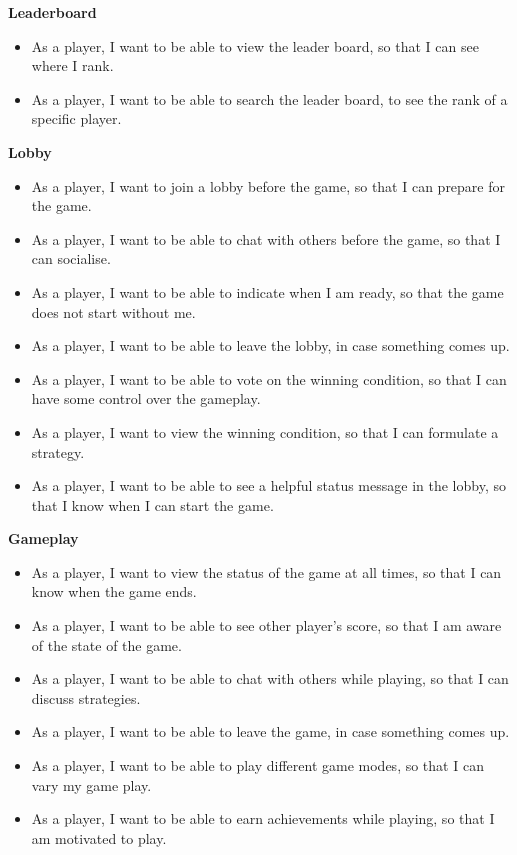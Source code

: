 \documentclass{l4proj}
\begin{document}
\textbf{Leaderboard}
\begin{itemize}
    \item As a player, I want to be able to view the leader board, so that I can see where I rank.
    \item As a player, I want to be able to search the leader board, to see the rank of a specific player.
\end{itemize}

\textbf{Lobby}
\begin{itemize}
    \item As a player, I want to join a lobby before the game, so that I can prepare for the game.
    \item As a player, I want to be able to chat with others before the game, so that I can socialise.
    \item As a player, I want to be able to indicate when I am ready, so that the game does not start without me.
    \item As a player, I want to be able to leave the lobby, in case something comes up.
    \item As a player, I want to be able to vote on the winning condition, so that I can have some control over the gameplay.
    \item As a player, I want to view the winning condition, so that I can formulate a strategy.
    \item As a player, I want to be able to see a helpful status message in the lobby, so that I know when I can start the game.
\end{itemize}

\textbf{Gameplay}
\begin{itemize}
    \item As a player, I want to view the status of the game at all times, so that I can know when the game ends.
    \item As a player, I want to be able to see other player's score, so that I am aware of the state of the game.
    \item As a player, I want to be able to chat with others while playing, so that I can discuss strategies.
    \item As a player, I want to be able to leave the game, in case something comes up.
    \item As a player, I want to be able to play different game modes, so that I can vary my game play.
    \item As a player, I want to be able to earn achievements while playing, so that I am motivated to play.
\end{itemize}
\end{document}
